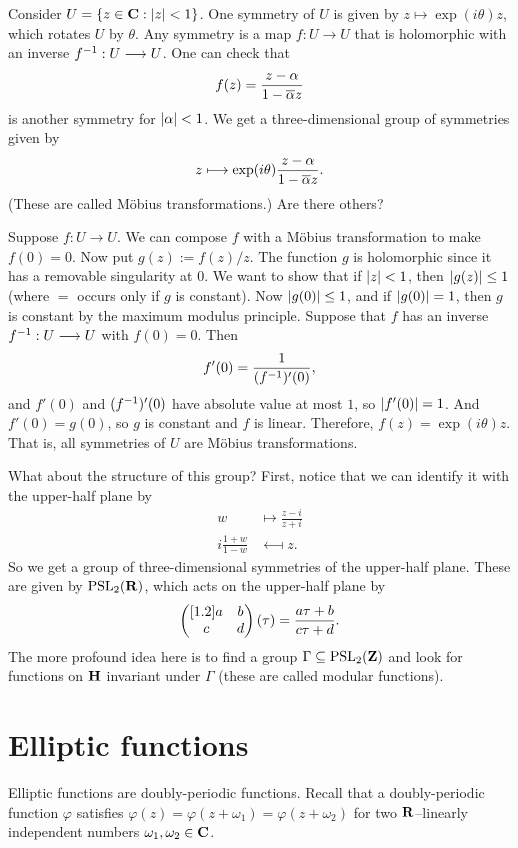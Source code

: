 \documentclass[11pt, oneside,margin=1in]{article}
\begin{document}
Consider $U=\{z\in \mathbf C :\left \lvert z \right \rvert < 1\}$. One symmetry of $U$ is given by $z\longmapsto \exp(i\theta)z$, which rotates $U$ by $\theta$. Any symmetry is a map $f:U\longrightarrow U$ that is holomorphic with an inverse $f^{-1} : U\longrightarrow U$. One can check that
\begin{align*}
	f(z) = \frac{z-\alpha}{1-\overline\alpha z}
\end{align*}
is another symmetry for $\left \lvert \alpha \right \rvert < 1$. We get a three-dimensional group of symmetries given by 
\begin{align*}
	z \longmapsto \exp(i\theta) \frac{z-\alpha}{1-\overline\alpha z}.
\end{align*}
(These are called M\"obius transformations.) Are there others?

Suppose $f:U\longrightarrow U$. We can compose $f$ with a M\"obius transformation to make $f(0)=0$. Now put $g(z):=f (z)/z$. The function $g$ is holomorphic since it has a removable singularity at $0$. We want to show that if $\left \lvert z \right \rvert<1$, then $\left \lvert g(z) \right \rvert\le 1$ (where $=$ occurs only if $g$ is constant). Now $\left \lvert g(0) \right \rvert \le 1$, and if $\left \lvert g(0) \right \rvert = 1$, then $g$ is constant by the maximum modulus principle. Suppose that $f$ has an inverse $f^{-1} : U\longrightarrow U$ with $f(0)=0$. Then 
\begin{align*}
	f'(0) = \frac{1}{ (f^{-1})'  (0)},
\end{align*}
and $f'(0)$ and $(f^{-1})' (0)$ have absolute value at most $1$, so $\left \lvert f'(0) \right \rvert = 1$. And $f'(0)=g (0)$, so $g$ is constant and $f$ is linear. Therefore, $f(z)=\exp (i\theta)z$. That is, all symmetries of $U$ are M\"obius transformations.

What about the structure of this group? First, notice that we can identify it with the upper-half plane by
\begin{align*}
	w &\longmapsto \frac{z-i}{z+i}\\
	i\frac{1+w}{1-w} &\longmapsfrom z.
\end{align*}
So we get a group of three-dimensional symmetries of the upper-half plane. These are given by $\operatorname{PSL}_2(\mathbf R)$, which acts on the upper-half plane by 
\begin{align*}
	\begin{pmatrix} [ 1.2 ] a&b\\c&d\end{pmatrix}(\tau) = \frac{a\tau + b}{c\tau +d}.
\end{align*}
The more profound idea here is to find a group $\Gamma\subseteq \operatorname{PSL}_2(\mathbf Z)$ and look for functions on $\mathbf H$ invariant under $\Gamma$ (these are called modular functions). 

\section{Elliptic functions}
Elliptic functions are doubly-periodic functions. Recall that a doubly-periodic function $\varphi$ satisfies $\varphi(z) = \varphi (z+\omega_1) = \varphi  (z+\omega_2)$ for two $\mathbf R$--linearly independent numbers $\omega_1,\omega_2\in \mathbf C$. 
\end{document}
